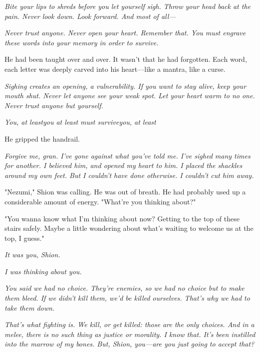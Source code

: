 \emph{Bite your lips to shreds before you let yourself sigh. Throw your head
back at the pain. Never look down. Look forward. And most of all---}

\emph{Never trust anyone. Never open your heart. Remember that. You must
engrave these words into your memory in order to survive.}

He had been taught over and over. It wasn't that he had forgotten. Each
word, each letter was deeply carved into his heart---like a mantra, like a
curse.

\emph{Sighing creates an opening, a vulnerability. If you want to stay alive,
keep your mouth shut. Never let anyone see your weak spot. Let your
heart warm to no one. Never trust anyone but yourself.}

\emph{You, at least\el you at least must survive\el you, at least\el }

He gripped the handrail.

\emph{Forgive me, gran. I've gone against what you've told me. I've sighed
many times for another. I believed him, and opened my heart to him. I
placed the shackles around my own feet. But I couldn't have done
otherwise. I couldn't cut him away.}

"Nezumi," Shion was calling. He was out of breath. He had probably used
up a considerable amount of energy. "What're you thinking about?"

"You wanna know what I'm thinking about now? Getting to the top of these
stairs safely. Maybe a little wondering about what's waiting to welcome
us at the top, I guess."

\emph{It was you, Shion.}

\emph{I was thinking about you.}

\emph{You said we had no choice. They're enemies, so we had no choice but to
make them bleed. If we didn't kill them, we'd be killed ourselves.
That's why we had to take them down.}

\emph{That's what fighting is. We kill, or get killed: those are the only
choices. And in a melee, there is no such thing as justice or morality.
I know that. It's been instilled into the marrow of my bones. But,
Shion, you---are you just going to accept that? Are you able to? Are you
letting yourself?}

'You put everything into dichotomies. You either love or you hate.
You're either friends or enemies. Outside the wall, or inside the wall.
And you always say you can only ever choose one of them.'

